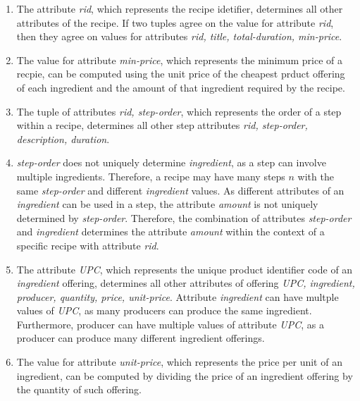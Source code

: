 \documentclass[letterpaper]{article}
\theoremstyle{plain}
\theoremstyle{definition}
\theoremstyle{remark}
\begin{document}
\begin{enumerate}
    \item The attribute \textit{rid}, which represents the recipe idetifier, determines all other attributes of the recipe. If two tuples agree on the value for attribute \textit{rid}, then they agree on values for attributes \textit{rid, title, total-duration, min-price}.
    \item The value for attribute \textit{min-price}, which represents the minimum price of a recpie, can be computed using the unit price of the cheapest prduct offering of each ingredient and the amount of that ingredient required by the recipe.
    \item The tuple of attributes \textit{rid, step-order}, which represents the order of a step within a recipe, determines all other step attributes \textit{rid, step-order, description, duration}.
    \item \textit{step-order} does not uniquely determine \textit{ingredient}, as a step can involve multiple ingredients. Therefore, a recipe may have many steps $n$ with the same \textit{step-order} and different \textit{ingredient} values. As different attributes of an \textit{ingredient} can be used in a step, the attribute \textit{amount} is not uniquely determined by \textit{step-order}. Therefore, the combination of attributes \textit{step-order} and \textit{ingredient} determines the attribute \textit{amount} within the context of a specific recipe with attribute \textit{rid}.
    \item The attribute \textit{UPC}, which represents the unique product identifier code of an \textit{ingredient} offering, determines all other attributes of offering \textit{UPC, ingredient, producer, quantity, price, unit-price}. Attribute \textit{ingredient} can have multple values of \textit{UPC}, as many producers can produce the same ingredient. Furthermore, producer can have multiple values of attribute \textit{UPC}, as a producer can produce many different ingredient offerings.
    \item The value for attribute \textit{unit-price}, which represents the price per unit of an ingredient, can be computed by dividing the price of an ingredient offering by the quantity of such offering.
\end{enumerate}

\subsubsection{}
\end{document}
